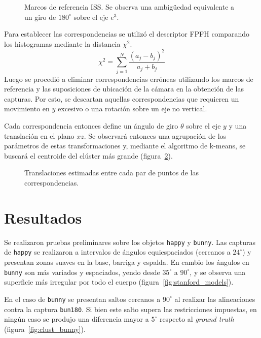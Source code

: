 		\begin{figure}
			\caption{\label{fig:marco_referencia_iss}Marcos de referencia ISS. Se observa una ambigüedad equivalente a un giro de $180^{\circ}$ sobre el eje $e^{3}$.}
		\end{figure}

		Para establecer las correspondencias se utilizó el descriptor FPFH
		comparando los histogramas mediante la distancia $\chi^2$.
		\[ \chi^2 = \sum_{j=1}^{N} \frac{\left(a_j - b_j\right)^2}{a_j + b_j} \]
		Luego se
		procedió a eliminar correspondencias erróneas utilizando los marcos de
		referencia y las suposiciones de ubicación de la cámara en la obtención
		de las capturas.  Por esto, se descartan aquellas correspondencias que
		requieren un movimiento en $y$ excesivo o una rotación sobre un eje no
		vertical. 

		Cada correspondencia entonces define un ángulo de giro $\theta$ sobre
		el eje $y$ y una translación en el plano $xz$.  Se observará entonces
		una agrupación de los parámetros de estas transformaciones y, mediante el
		algoritmo de k-means, se buscará el centroide del clúster más grande (figura~\ref{fig:cluster}).
		\begin{figure}
			\resizebox{.9\linewidth}{!}{}
			\caption{\label{fig:cluster}Translaciones estimadas entre cada par
			de puntos de las correspondencias.}
		\end{figure}

		\section{Resultados}

			Se realizaron pruebas preliminares sobre los objetos \texttt{happy} y \texttt{bunny}.
			Las capturas de \texttt{happy} se realizaron a intervalos de ángulos equiespaciados (cercanos a $24^{\circ}$) y
			presentan zonas suaves en la base, barriga y espalda.
			En cambio los ángulos en \texttt{bunny} son más variados y espaciados, yendo desde $35^{\circ}$ a $90^{\circ}$,
			y se observa una superficie más irregular por todo el cuerpo (figura~\ref{fig:stanford_models}).%


			En el caso de \texttt{bunny} se presentan saltos cercanos a $90^{\circ}$ al realizar las alineaciones
			contra la captura \texttt{bun180}. Si bien este salto supera las restricciones impuestas,
			en ningún caso se produjo una diferencia mayor a $5^{\circ}$ respecto al \emph{ground truth} (figura~\ref{fig:clust_bunny}).


